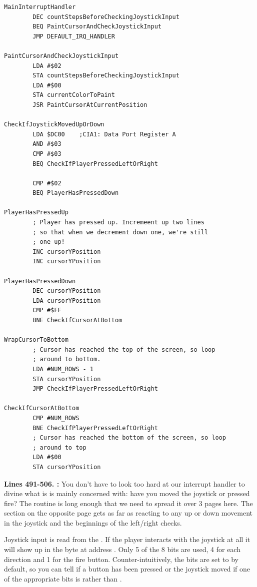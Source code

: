 \clearpage
\begin{lstlisting}[caption= This is our interrupt handler\, it runs 60 times a second so has to be fast.]
MainInterruptHandler   
        DEC countStepsBeforeCheckingJoystickInput
        BEQ PaintCursorAndCheckJoystickInput
        JMP DEFAULT_IRQ_HANDLER

PaintCursorAndCheckJoystickInput   
        LDA #$02
        STA countStepsBeforeCheckingJoystickInput
        LDA #$00
        STA currentColorToPaint
        JSR PaintCursorAtCurrentPosition

CheckIfJoystickMovedUpOrDown   
        LDA $DC00    ;CIA1: Data Port Register A
        AND #$03
        CMP #$03
        BEQ CheckIfPlayerPressedLeftOrRight

        CMP #$02
        BEQ PlayerHasPressedDown

PlayerHasPressedUp
        ; Player has pressed up. Incremeent up two lines
        ; so that when we decrement down one, we're still
        ; one up!
        INC cursorYPosition
        INC cursorYPosition

PlayerHasPressedDown   
        DEC cursorYPosition
        LDA cursorYPosition
        CMP #$FF
        BNE CheckIfCursorAtBottom

WrapCursorToBottom
        ; Cursor has reached the top of the screen, so loop
        ; around to bottom.
        LDA #NUM_ROWS - 1
        STA cursorYPosition
        JMP CheckIfPlayerPressedLeftOrRight

CheckIfCursorAtBottom   
        CMP #NUM_ROWS
        BNE CheckIfPlayerPressedLeftOrRight
        ; Cursor has reached the bottom of the screen, so loop
        ; around to top
        LDA #$00
        STA cursorYPosition

\end{lstlisting}
\clearpage

\textbf{Lines 491-506. :}  You don't have to look too hard at our interrupt handler
to divine what is is mainly concerned with: have you moved the joystick or pressed fire? The routine is long enough
that we need to spread it over 3 pages here. The section on the opposite page gets as far as reacting to any up or
down movement in the joystick and the beginnings of the left/right checks. 

Joystick input is read from the . If the player interacts with the joystick at all it will
show up in the byte at address . Only 5 of the 8 bits are used, 4 for each direction and 1 for the fire button.
Counter-intuitively, the bits are set to  by default, so you can tell if a button has been pressed or the joystick moved
if one of the appropriate bits is  rather than .

